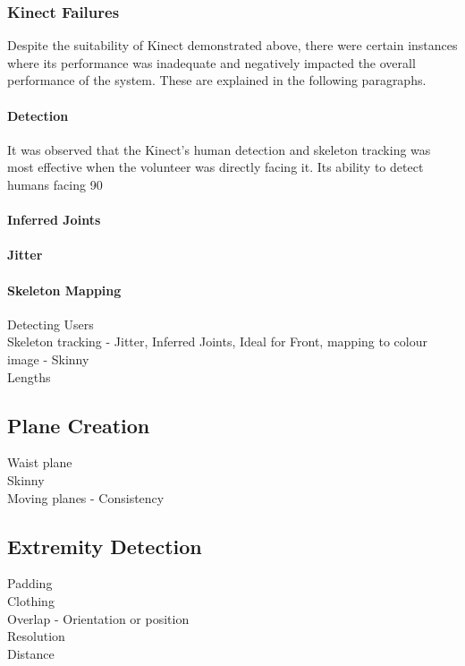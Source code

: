\subsubsection{Kinect Failures}
Despite the suitability of Kinect demonstrated above, there were certain instances where its performance was inadequate and negatively impacted the overall performance of the system. These are explained in the following paragraphs. 

\paragraph{Detection}
It was observed that the Kinect's human detection and skeleton tracking was most effective when the volunteer was directly facing it. Its ability to detect humans facing 90 \degree

\paragraph{Inferred Joints}

\paragraph{Jitter}

\paragraph{Skeleton Mapping}
Detecting Users\\
Skeleton tracking - Jitter, Inferred Joints, Ideal for Front, mapping to colour image - Skinny\\
Lengths\\


\subsection{Plane Creation}
Waist plane\\
Skinny\\
Moving planes - Consistency\\

\subsection{Extremity Detection}
Padding\\
Clothing\\
Overlap - Orientation or position\\
Resolution\\
Distance\\

